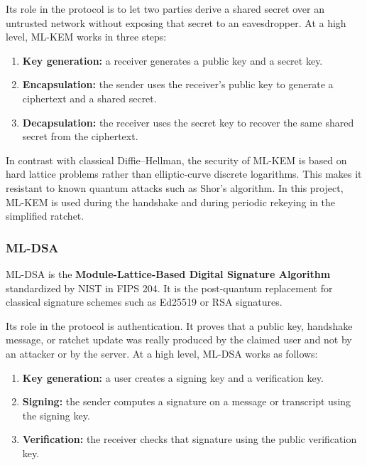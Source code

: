 \documentclass{article}
\begin{document}
      Its role in the protocol is to let two parties derive a shared secret over
      an untrusted network without exposing that secret to an eavesdropper. At a
      high level, ML-KEM works in three steps:
      \begin{enumerate}
            \item \textbf{Key generation:} a receiver generates a public key and
                  a secret key.
            \item \textbf{Encapsulation:} the sender uses the receiver's public
                  key to generate a ciphertext and a shared secret.
            \item \textbf{Decapsulation:} the receiver uses the secret key to
                  recover the same shared secret from the ciphertext.
      \end{enumerate}

      In contrast with classical Diffie--Hellman, the security of ML-KEM is
      based on hard lattice problems rather than elliptic-curve discrete
      logarithms. This makes it resistant to known quantum attacks such as
      Shor's algorithm. In this project, ML-KEM is used during the handshake and
      during periodic rekeying in the simplified ratchet.

      \subsubsection{ML-DSA}
      ML-DSA is the \textbf{Module-Lattice-Based Digital Signature Algorithm}
      standardized by NIST in FIPS 204. It is the post-quantum replacement for
      classical signature schemes such as Ed25519 or RSA signatures.

      Its role in the protocol is authentication. It proves that a public key,
      handshake message, or ratchet update was really produced by the claimed
      user and not by an attacker or by the server. At a high level, ML-DSA
      works as follows:
      \begin{enumerate}
            \item \textbf{Key generation:} a user creates a signing key and a
                  verification key.
            \item \textbf{Signing:} the sender computes a signature on a message
                  or transcript using the signing key.
            \item \textbf{Verification:} the receiver checks that signature using
                  the public verification key.
      \end{enumerate}
\end{document}
